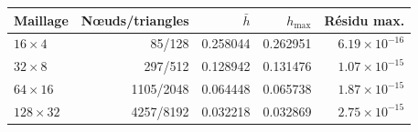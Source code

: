 \begin{tabular}{lrrrr}
\toprule
Maillage & Nœuds/triangles & \(\bar h\) & \(h_{\max}\) & Résidu max. \\
\midrule
\(16\times4\) & 85/128 & 0.258044 & 0.262951 & \(6.19\times10^{-16}\) \\
\(32\times8\) & 297/512 & 0.128942 & 0.131476 & \(1.07\times10^{-15}\) \\
\(64\times16\) & 1105/2048 & 0.064448 & 0.065738 & \(1.87\times10^{-15}\) \\
\(128\times32\) & 4257/8192 & 0.032218 & 0.032869 & \(2.75\times10^{-15}\) \\
\bottomrule
\end{tabular}
